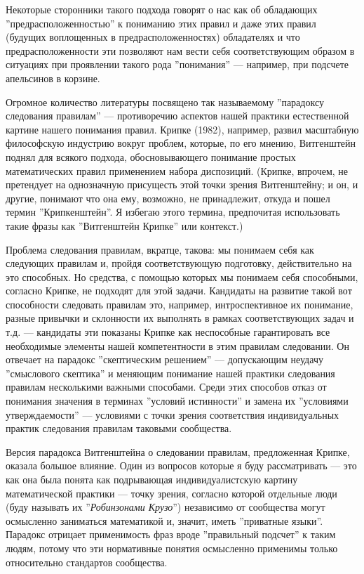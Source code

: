 \documentclass[11pt]{book}
\begin{document}
Некоторые сторонники такого подхода говорят о нас как об обладающих ''предрасположенностью'' к пониманию этих правил и даже этих правил (будущих воплощенных в предрасположенностях) обладателях и что предрасположенности эти позволяют нам вести себя соответствующим образом в ситуациях при проявлении такого рода ''понимания'' --- например, при подсчете апельсинов в корзине.

Огромное количество литературы посвящено так называемому ''парадоксу следования правилам'' --- противоречию аспектов нашей практики естественной картине нашего понимания правил. Крипке (1982), например, развил масштабную философскую индустрию вокруг проблем, которые, по его мнению, Витгенштейн поднял для всякого подхода, обосновывающего понимание простых математических правил применением набора диспозиций. (Крипке, впрочем, не претендует на однозначную присущесть этой точки зрения Витгенштейну; и он, и другие, понимают что она ему, возможно, не принадлежит, откуда и пошел термин ''Крипкенштейн''. Я избегаю этого термина, предпочитая использовать такие фразы как ''Витгенштейн Крипке'' или контекст.)

Проблема следования правилам, вкратце, такова: мы понимаем себя как следующих правилам и, пройдя соответствующую подготовку, действительно на это способных. Но средства, с помощью которых мы понимаем себя способными, согласно Крипке, не подходят для этой задачи. Кандидаты на развитие такой вот способности следовать правилам это, например, интроспективное их понимание, разные привычки и склонности их выполнять в рамках соответствующих задач и т.д. --- кандидаты эти показаны Крипке как неспособные гарантировать все необходимые элементы нашей компетентности в этим правилам следовании. Он отвечает на парадокс ''скептическим решением'' --- допускающим неудачу ''смыслового скептика'' и меняющим понимание нашей практики следования правилам несколькими важными способами. Среди этих способов отказ от понимания значения в терминах ''условий истинности'' и замена их ''условиями утверждаемости'' --- условиями с точки зрения соответствия индивидуальных практик следования правилам таковыми сообщества.

Версия парадокса Витгенштейна о следовании правилам, предложенная Крипке, оказала большое влияние. Один из вопросов которые я буду рассматривать --- это как она была понята как подрывающая индивидуалистскую картину математической практики --- точку зрения, согласно которой отдельные люди (буду называть их ''\textit{Робинзонами Крузо}'') независимо от сообщества могут осмысленно заниматься математикой и, значит, иметь ''приватные языки''. Парадокс отрицает применимость фраз вроде ''правильный подсчет'' к таким людям, потому что эти нормативные понятия осмысленно применимы только относительно стандартов сообщества.
\end{document}
